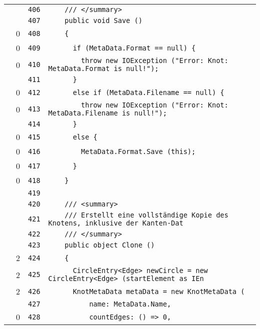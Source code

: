 \documentclass[a4paper,10pt]{article}
\begin{document}
\begin{longtable}[l]{lrrl}
\cellcolor{gray} &  & \verb~406~ & \verb~    /// </summary>~\\
\cellcolor{gray} &  & \verb~407~ & \verb~    public void Save ()~\\
\cellcolor{red} & 0 & \verb~408~ & \verb~    {~\\
\cellcolor{red} & 0 & \verb~409~ & \verb~      if (MetaData.Format == null) {~\\
\cellcolor{red} & 0 & \verb~410~ & \verb~        throw new IOException ("Error: Knot: MetaData.Format is null!");~\\
\cellcolor{gray} &  & \verb~411~ & \verb~      }~\\
\cellcolor{red} & 0 & \verb~412~ & \verb~      else if (MetaData.Filename == null) {~\\
\cellcolor{red} & 0 & \verb~413~ & \verb~        throw new IOException ("Error: Knot: MetaData.Filename is null!");~\\
\cellcolor{gray} &  & \verb~414~ & \verb~      }~\\
\cellcolor{red} & 0 & \verb~415~ & \verb~      else {~\\
\cellcolor{red} & 0 & \verb~416~ & \verb~        MetaData.Format.Save (this);~\\
\cellcolor{red} & 0 & \verb~417~ & \verb~      }~\\
\cellcolor{red} & 0 & \verb~418~ & \verb~    }~\\
\cellcolor{gray} &  & \verb~419~ & \verb~~\\
\cellcolor{gray} &  & \verb~420~ & \verb~    /// <summary>~\\
\cellcolor{gray} &  & \verb~421~ & \verb~    /// Erstellt eine vollständige Kopie des Knotens, inklusive der Kanten-Dat~\\
\cellcolor{gray} &  & \verb~422~ & \verb~    /// </summary>~\\
\cellcolor{gray} &  & \verb~423~ & \verb~    public object Clone ()~\\
\cellcolor{green} & 2 & \verb~424~ & \verb~    {~\\
\cellcolor{green} & 2 & \verb~425~ & \verb~      CircleEntry<Edge> newCircle = new CircleEntry<Edge> (startElement as IEn~\\
\cellcolor{green} & 2 & \verb~426~ & \verb~      KnotMetaData metaData = new KnotMetaData (~\\
\cellcolor{gray} &  & \verb~427~ & \verb~          name: MetaData.Name,~\\
\cellcolor{red} & 0 & \verb~428~ & \verb~          countEdges: () => 0,~\\

\end{longtable}
\end{document}
